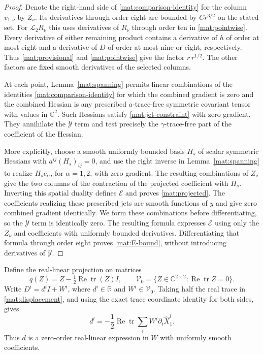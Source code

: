 \begin{proof}
Denote the right-hand side of
\eqref{mat:comparison-identity} for the column $v_{1,\nu}$ by
$Z_\nu$.  Its derivatives through order eight are bounded by
$Cr^{3/2}$ on the stated set.  For $\mathcal L_2R_\nu$ this uses
derivatives of $R_\nu$ through order ten in
\eqref{mat:pointwise}.  Every derivative of either remaining product
contains a derivative of $h$ of order at most eight and a derivative
of $D$ of order at most nine or eight, respectively.  Thus
\eqref{mat:provisional} and \eqref{mat:pointwise} give the factor
$r\,r^{1/2}$.  The other factors are fixed smooth derivatives of the
selected columns.

At each point, Lemma~\ref{mat:spanning} permits linear combinations of
the identities \eqref{mat:comparison-identity} for which the combined
gradient is zero and the combined Hessian is any prescribed
$a$-trace-free symmetric covariant tensor with values in
$\mathbb C^2$.  Such Hessians satisfy
\eqref{mat:jet-constraint} with zero gradient.  They annihilate the
$\mathcal Y$ term and test precisely the $\gamma$-trace-free part of
the coefficient of the Hessian.

More explicitly, choose a smooth uniformly bounded basis $H_s$ of
scalar symmetric Hessians with $a^{ij}(H_s)_{ij}=0$, and use the right
inverse in Lemma~\ref{mat:spanning} to realize $H_se_\alpha$, for
$\alpha=1,2$, with zero gradient.  The resulting combinations of
$Z_\nu$ give the two columns of the contraction of the projected
coefficient with $H_s$.  Inverting this spatial duality defines
$\mathcal E$ and proves \eqref{mat:projected}.  The coefficients
realizing these prescribed jets are smooth functions of $y$ and give
zero combined gradient identically.  We form these combinations
before differentiating, so the $\mathcal Y$ term is identically zero.
The resulting formula expresses $\mathcal E$ using only the $Z_\nu$
and coefficients with uniformly bounded derivatives.  Differentiating
that formula through order eight proves \eqref{mat:E-bound}, without
introducing derivatives of $\mathcal Y$.
\end{proof}

Define the real-linear projection on matrices
\[
 q(Z)=Z-\tfrac12\operatorname{Re}\operatorname{tr}(Z)I,
 \qquad
 \mathcal V_0=\{Z\in\mathbb C^{2\times2}:
                      \operatorname{Re}\operatorname{tr}Z=0\}.
\]
Write $D^i=d^iI+W^i$, where $d^i\in\mathbb R$ and
$W^i\in\mathcal V_0$.  Taking half the real trace in
\eqref{mat:displacement}, and using the exact trace coordinate
identity for both sides, gives
\begin{equation}
 d^l=-\frac12\operatorname{Re}\operatorname{tr}
                    \sum_i W^i\partial_i\widehat X_1^l.
 \label{mat:scalar-direction}
\end{equation}
Thus $d$ is a zero-order real-linear expression in $W$ with uniformly
smooth coefficients.

